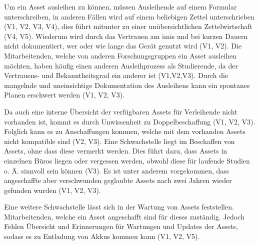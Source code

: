 Um ein Asset ausleihen zu können, müssen Ausleihende auf einem Formular unterschreiben, in anderen
Fällen wird auf einem beliebigen Zettel unterschrieben (V1, V2, V3, V4), dies führt mitunter zu einer
unübersichtlichen Zettelwirtschaft (V4, V5). Wiederum wird durch das Vertrauen am \ac{imis} und bei
kurzen Dauern nicht dokumentiert, wer oder wie lange das Gerät genutzt wird (V1, V2). Die
Mitarbeitenden, welche von anderen Forschungsgruppen ein Asset ausleihen möchten, haben häufig einen
anderen Ausleihprozess als Studierende, da der Vertrauens- und Bekanntheitsgrad ein anderer ist
(V1,V2,V3). Durch die mangelnde und uneinsichtige Dokumentation des Ausleihens kann ein spontanes
Planen erschwert werden (V1, V2, V3).

Da auch eine interne Übersicht der verfügbaren Assets für Verleihende nicht vorhanden ist, kommt es
durch Unwissenheit zu Doppelbeschaffung (V1, V2, V3). Folglich kann es zu Anschaffungen kommen,
welche mit dem vorhanden Assets nicht kompatible sind (V2, V3). Eine Schwachstelle liegt im
Beschaffen von Assets, ohne dass diese vermerkt werden. Dies führt dazu, dass Assets in einzelnen
Büros liegen oder vergessen werden, obwohl diese für laufende Studien o. Ä. sinnvoll sein können
(V3). Es ist unter anderem vorgekommen, dass angeschaffte aber verschwunden geglaubte Assets nach
zwei Jahren wieder gefunden wurden (V1, V2, V3).

Eine weitere Schwachstelle lässt sich in der Wartung von Assets feststellen. Mitarbeitenden, welche
ein Asset angeschafft sind für dieses zuständig. Jedoch Fehlen Übersicht und Erinnerungen für
Wartungen und Updates der Assets, sodass es zu Entladung von Akkus kommen kann (V1, V2, V5).

